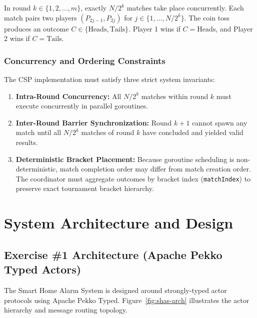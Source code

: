 \documentclass[11pt,a4paper]{article}
\begin{document}
In round $k \in \{1, 2, \dots, m\}$, exactly $N / 2^k$ matches take place concurrently. Each match pairs two players $(P_{2j-1}, P_{2j})$ for $j \in \{1, \dots, N/2^k\}$. The coin toss produces an outcome $C \in \{\text{Heads}, \text{Tails}\}$. Player 1 wins if $C = \text{Heads}$, and Player 2 wins if $C = \text{Tails}$.

\subsubsection{Concurrency and Ordering Constraints}

The CSP implementation must satisfy three strict system invariants:
\begin{enumerate}
    \item \textbf{Intra-Round Concurrency:} All $N/2^k$ matches within round $k$ must execute concurrently in parallel goroutines.
    \item \textbf{Inter-Round Barrier Synchronization:} Round $k+1$ cannot spawn any match until all $N/2^k$ matches of round $k$ have concluded and yielded valid results.
    \item \textbf{Deterministic Bracket Placement:} Because goroutine scheduling is non-deterministic, match completion order may differ from match creation order. The coordinator must aggregate outcomes by bracket index (\texttt{matchIndex}) to preserve exact tournament bracket hierarchy.
\end{enumerate}

\section{System Architecture and Design}

\subsection{Exercise \#1 Architecture (Apache Pekko Typed Actors)}

The Smart Home Alarm System is designed around strongly-typed actor protocols using Apache Pekko Typed. Figure~\ref{fig:shas-arch} illustrates the actor hierarchy and message routing topology.
\end{document}
